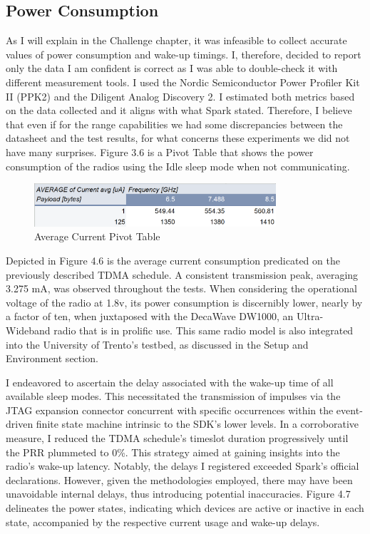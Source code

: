 \subsection{Power Consumption}
As I will explain in the Challenge chapter, it was infeasible to collect accurate values of power consumption and wake-up timings. I, therefore, decided to report only the data I am confident is correct as I was able to double-check it with different measurement tools. I used the Nordic Semiconductor Power Profiler Kit II (PPK2) and the Diligent Analog Discovery 2. I estimated both metrics based on the data collected and it aligns with what Spark stated. Therefore, I believe that even if for the range capabilities we had some discrepancies between the datasheet and the test results, for what concerns these experiments we did not have many surprises. Figure 3.6 is a Pivot Table that shows the power consumption of the radios using the Idle sleep mode when not communicating.

\begin{figure}[h]
\centering
\includegraphics[width=0.8\textwidth]{images/power consumption.png}
\caption{Average Current Pivot Table}
\label{fig:avg_current_pivot}
\end{figure}

Depicted in Figure 4.6 is the average current consumption predicated on the previously described TDMA schedule. A consistent transmission peak, averaging 3.275 mA, was observed throughout the tests. When considering the operational voltage of the radio at 1.8v, its power consumption is discernibly lower, nearly by a factor of ten, when juxtaposed with the DecaWave DW1000, an Ultra-Wideband radio that is in prolific use. This same radio model is also integrated into the University of Trento’s testbed, as discussed in the Setup and Environment section.

I endeavored to ascertain the delay associated with the wake-up time of all available sleep modes. This necessitated the transmission of impulses via the JTAG expansion connector concurrent with specific occurrences within the event-driven finite state machine intrinsic to the SDK's lower levels. In a corroborative measure, I reduced the TDMA schedule's timeslot duration progressively until the PRR plummeted to 0\%. This strategy aimed at gaining insights into the radio's wake-up latency. Notably, the delays I registered exceeded Spark's official declarations. However, given the methodologies employed, there may have been unavoidable internal delays, thus introducing potential inaccuracies. Figure 4.7 delineates the power states, indicating which devices are active or inactive in each state, accompanied by the respective current usage and wake-up delays.

